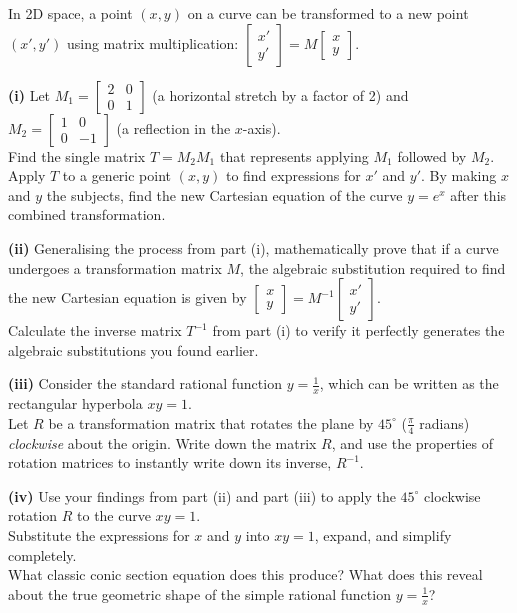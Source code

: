 \begin{problem}
In 2D space, a point $(x,y)$ on a curve can be transformed to a new point $(x', y')$ using matrix multiplication: $\begin{bmatrix} x' \\ y' \end{bmatrix} = M \begin{bmatrix} x \\ y \end{bmatrix}$. 

\textbf{(i)} Let $M_1 = \begin{bmatrix} 2 & 0 \\ 0 & 1 \end{bmatrix}$ (a horizontal stretch by a factor of 2) and $M_2 = \begin{bmatrix} 1 & 0 \\ 0 & -1 \end{bmatrix}$ (a reflection in the $x$-axis). \\
Find the single matrix $T = M_2 M_1$ that represents applying $M_1$ followed by $M_2$. \\
Apply $T$ to a generic point $(x,y)$ to find expressions for $x'$ and $y'$. By making $x$ and $y$ the subjects, find the new Cartesian equation of the curve $y = e^x$ after this combined transformation.

\textbf{(ii)} Generalising the process from part (i), mathematically prove that if a curve undergoes a transformation matrix $M$, the algebraic substitution required to find the new Cartesian equation is given by $\begin{bmatrix} x \\ y \end{bmatrix} = M^{-1} \begin{bmatrix} x' \\ y' \end{bmatrix}$. \\
Calculate the inverse matrix $T^{-1}$ from part (i) to verify it perfectly generates the algebraic substitutions you found earlier.

\textbf{(iii)} Consider the standard rational function $y = \frac{1}{x}$, which can be written as the rectangular hyperbola $xy = 1$. \\
Let $R$ be a transformation matrix that rotates the plane by $45^\circ$ ($\frac{\pi}{4}$ radians) \textit{clockwise} about the origin. Write down the matrix $R$, and use the properties of rotation matrices to instantly write down its inverse, $R^{-1}$.

\textbf{(iv)} Use your findings from part (ii) and part (iii) to apply the $45^\circ$ clockwise rotation $R$ to the curve $xy = 1$. \\
Substitute the expressions for $x$ and $y$ into $xy = 1$, expand, and simplify completely. \\
What classic conic section equation does this produce? What does this reveal about the true geometric shape of the simple rational function $y = \frac{1}{x}$?
\end{problem}

